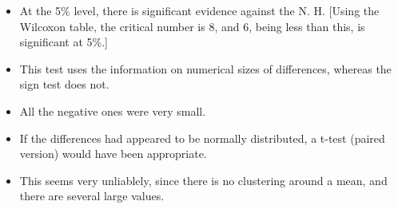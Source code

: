 \documentclass[a4paper,12pt]{article}
\begin{document}
\begin{enumerate}
\begin{itemize}
    \item At the 5\% level, there is significant evidence against the N. H. [Using the
Wilcoxon table, the critical number is 8, and 6, being less than this, is
significant at 5\%.]
\item This test uses the information on numerical sizes of differences, whereas the
sign test does not.
\item All the negative ones were very small.
\item If the differences had appeared to be normally distributed, a t-test (paired
version) would have been appropriate. 
\item This seems very unliablely, since there
is no clustering around a mean, and there are several large values.
\end{itemize}

\end{enumerate}
\end{document}

